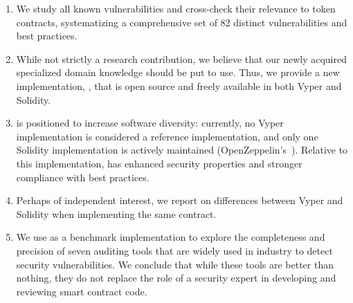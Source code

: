 \begin{enumerate}[\setlength{\labelsep}{3pt}\setlength{\IEEElabelindent}{0pt}]
\item We study all known vulnerabilities and cross-check their relevance to \erc token contracts, systematizing a comprehensive set of 82 distinct vulnerabilities and best practices. 
\item While not strictly a research contribution, we believe that our newly acquired specialized domain knowledge should be put to use. Thus, we provide a new \erc implementation, \sys, that is open source and freely available in both Vyper and Solidity.
\item \sys is positioned to increase software diversity: currently, no Vyper \erc implementation is considered a reference implementation, and only one Solidity implementation is actively maintained (OpenZeppelin's~\cite{OpenZepplin}). Relative to this implementation, \sys has enhanced security properties and stronger compliance with best practices. 
\item Perhaps of independent interest, we report on differences between Vyper and Solidity when implementing the same contract. \item We use \sys as a benchmark implementation to explore the completeness and precision of seven auditing tools that are widely used in industry to detect security vulnerabilities. We conclude that while these tools are better than nothing, they do not replace the role of a security expert in developing and reviewing smart contract code.
\end{enumerate}





